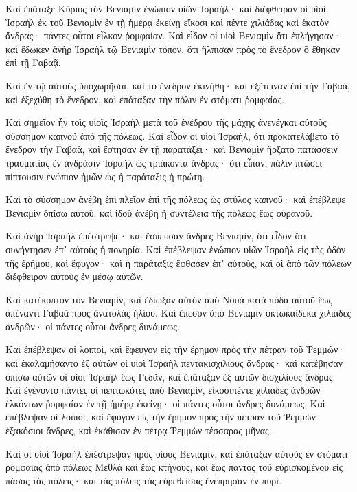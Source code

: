 {Καὶ ἐπάταξε Κύριος τὸν Βενιαμὶν ἐνώπιον υἱῶν Ἰσραήλ· καὶ διέφθειραν οἱ υἱοὶ Ἰσραὴλ ἐκ τοῦ Βενιαμὶν ἐν τῇ ἡμέρᾳ ἐκείνῃ εἴκοσι καὶ πέντε χιλιάδας καὶ ἑκατὸν ἄνδρας· πάντες οὗτοι εἷλκον ῥομφαίαν.
Καὶ εἶδον οἱ υἱοὶ Βενιαμὶν ὅτι ἐπλήγησαν· καὶ ἔδωκεν ἀνὴρ Ἰσραὴλ τῷ Βενιαμὶν τόπον, ὅτι ἤλπισαν πρὸς τὸ ἔνεδρον ὃ ἔθηκαν ἐπὶ τῇ Γαβαᾷ.
\par }{\PP {}Καὶ ἐν τῷ αὐτοὺς ὑποχωρῆσαι, καὶ τὸ ἔνεδρον ἐκινήθη· καὶ ἐξέτειναν ἐπὶ τὴν Γαβαὰ, καὶ ἐξεχύθη τὸ ἔνεδρον, καὶ ἐπάταξαν τὴν πόλιν ἐν στόματι ῥομφαίας.
\par }{\PP {}Καὶ σημεῖον ἦν τοῖς υἱοῖς Ἰσραὴλ μετὰ τοῦ ἐνέδρου τῆς μάχης ἀνενέγκαι αὐτοὺς σύσσημον καπνοῦ ἀπὸ τῆς πόλεως.
Καὶ εἶδον οἱ υἱοὶ Ἰσραὴλ, ὅτι προκατελάβετο τὸ ἔνεδρον τὴν Γαβαὰ, καὶ ἔστησαν ἐν τῇ παρατάξει· καὶ Βενιαμὶν ἤρξατο πατάσσειν τραυματίας ἐν ἀνδράσιν Ἰσραὴλ ὡς τριάκοντα ἄνδρας· ὅτι εἶπαν, πάλιν πτώσει πίπτουσιν ἐνώπιον ἡμῶν ὡς ἡ παράταξις ἡ πρώτη.
\par }{\PP {}Καὶ τὸ σύσσημον ἀνέβη ἐπὶ πλεῖον ἐπὶ τῆς πόλεως ὡς στύλος καπνοῦ· καὶ ἐπέβλεψε Βενιαμὶν ὀπίσω αὐτοῦ, καὶ ἰδοὺ ἀνέβη ἡ συντέλεια τῆς πόλεως ἕως οὐρανοῦ.
\par }{\PP {}Καὶ ἀνὴρ Ἰσραὴλ ἐπέστρεψε· καὶ ἔσπευσαν ἄνδρες Βενιαμὶν, ὅτι εἶδον ὅτι συνήντησεν ἐπʼ αὐτοὺς ἡ πονηρία.
Καὶ ἐπέβλεψαν ἐνώπιον υἱῶν Ἰσραὴλ εἰς τὴς ὁδὸν τῆς ἐρήμου, καὶ ἔφυγον· καὶ ἡ παράταξις ἔφθασεν ἐπʼ αὐτοὺς, καὶ οἱ ἀπὸ τῶν πόλεων διέφθειρον αὐτοὺς ἐν μέσῳ αὐτῶν.
\par }{\PP {}Καὶ κατέκοπτον τὸν Βενιαμὶν, καὶ ἐδίωξαν αὐτὸν ἀπὸ Νουὰ κατὰ πόδα αὐτοῦ ἕως ἀπέναντι Γαβαὰ πρὸς ἀνατολὰς ἡλίου.
Καὶ ἔπεσον ἀπὸ Βενιαμὶν ὀκτωκαίδεκα χιλιάδες ἀνδρῶν· οἱ πάντες οὗτοι ἄνδρες δυνάμεως.
\par }{\PP {}Καὶ ἐπέβλεψαν οἱ λοιποὶ, καὶ ἔφευγον εἰς τὴν ἔρημον πρὸς τὴν πέτραν τοῦ Ῥεμμών· καὶ ἐκαλαμήσαντο ἐξ αὐτῶν οἱ υἱοὶ Ἰσραὴλ πεντακισχιλίους ἄνδρας· καὶ κατέβησαν ὀπίσω αὐτῶν οἱ υἱοὶ Ἰσραὴλ ἕως Γεδᾶν, καὶ ἐπάταξαν ἐξ αὐτῶν δισχιλίους ἄνδρας.
Καὶ ἐγένοντο πάντες οἱ πεπτωκότες ἀπὸ Βενιαμὶν, εἰκοσιπέντε χιλιάδες ἀνδρῶν ἑλκόντων ῥομφαίαν ἐν τῇ ἡμέρᾳ ἐκείνῃ· οἱ πάντες οὗτοι ἄνδρες δυνάμεως.
Καὶ ἐπέβλεψαν οἱ λοιποὶ, καὶ ἔφυγον εἰς τὴν ἔρημον πρὸς τὴν πέτραν τοῦ Ῥεμμὼν ἑξακόσιοι ἄνδρες, καὶ ἐκάθισαν ἐν πέτρᾳ Ῥεμμὼν τέσσαρας μῆνας.
\par }{\PP {}Καὶ οἱ υἱοὶ Ἰσραὴλ ἐπέστρεψαν πρὸς υἱοὺς Βενιαμὶν, καὶ ἐπάταξαν αὐτοὺς ἐν στόματι ῥομφαίας ἀπὸ πόλεως Μεθλὰ καὶ ἕως κτήνους, καὶ ἕως παντὸς τοῦ εὑρισκομένου εἰς πάσας τὰς πόλεις· καὶ τὰς πόλεις τὰς εὑρεθείσας ἐνέπρησαν ἐν πυρί.

}
